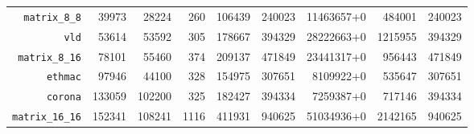 {\begin{tabular}{|r|r|r|r|r|r|r|r|r|}
   \texttt{matrix\_8\_8}         &   39973 &     28224 &       260 &  106439 &  240023 &  11463657+0 &  484001 &  240023 \\
   \texttt{vld}                  &   53614 &     53592 &       305 &  178667 &  394329 &  28222663+0 & 1215955 &  394329 \\
   \texttt{matrix\_8\_16}        &   78101 &     55460 &       374 &  209137 &  471849 &  23441317+0 &  956443 &  471849 \\
   \texttt{ethmac}               &   97946 &     44100 &       328 &  154975 &  307651 &   8109922+0 &  535647 &  307651 \\
   \texttt{corona}               &  133059 &    102200 &       325 &  182427 &  394334 &   7259387+0 &  717146 &  394334 \\
   \texttt{matrix\_16\_16}       &  152341 &    108241 &      1116 &  411931 &  940625 &  51034936+0 & 2142165 &  940625 \\
   \hline
 \end{tabular}
 }
